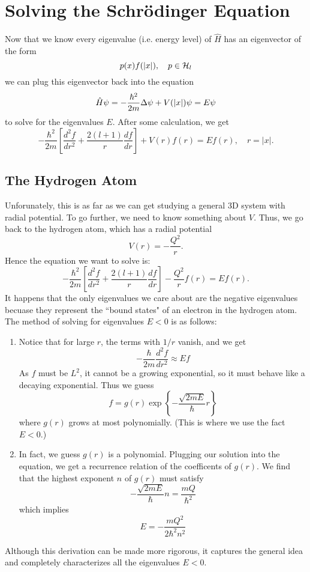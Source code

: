 \section{Solving the Schr\"{o}dinger Equation}
Now that we know every eigenvalue (i.e. energy level) of $\hat{H}$ has an eigenvector of the form
\[
    p(x)f(|x|), \quad p \in {\mathcal H}_l
\]
we can plug this eigenvector back into the equation
\[
    \hat{H}\psi = -\frac{\hbar^2}{2m}\Delta\psi + V(|x|)\psi = E\psi
\]
to solve for the eigenvalues $E$. After some calculation, we get
\[
    - \frac{\hbar^2}{2m}\left[ \frac{d^2f}{dr^2} + \frac{2(l+1)}{r} \frac{df}{dr} \right] + V(r)f(r) = Ef(r), \quad r = |x|.
\]
\subsection{The Hydrogen Atom}
Unforunately, this is as far as we can get studying a general 3D system with radial potential. To go further, we need to know something about $V$. Thus, we go back to the hydrogen atom, which has a radial potential
\[
    V(r) = - \frac{Q^2}{r}.
\]
Hence the equation we want to solve is:
\[
    - \frac{\hbar^2}{2m}\left[ \frac{d^2f}{dr^2} + \frac{2(l+1)}{r} \frac{df}{dr} \right] - \frac{Q^2}{r}f(r) = Ef(r).
\]
It happens that the only eigenvalues we care about are the negative eigenvalues becuase they represent the ``bound states" of an electron in the hydrogen atom. The method of solving for eigenvalues $E < 0$ is as follows:
\begin{enumerate}
    \item Notice that for large $r$, the terms with $1/r$ vanish, and we get
        \[
            - \frac{\hbar}{2m} \frac{d^2f}{dr^2} \approx Ef
        \]
        As $f$ must be $L^2$, it cannot be a growing exponential, so it must behave like a decaying exponential. Thus we guess
        \[
            f = g(r) \exp\left\{ - \frac{\sqrt{2mE}}{\hbar}r\right\}
        \]
        where $g(r)$ grows at most polynomially. (This is where we use the fact $E < 0$.)

    \item In fact, we guess $g(r)$ is a polynomial. Plugging our solution into the equation, we get a recurrence relation of the coefficents of $g(r)$. We find that the highest exponent $n$ of $g(r)$ must satisfy
        \[
            - \frac{\sqrt{2mE}}{\hbar} n = \frac{mQ}{\hbar^2}
        \]
        which implies
        \[
            E = - \frac{mQ^2}{2\hbar^2n^2}
        \]
\end{enumerate}
Although this derivation can be made more rigorous, it captures the general idea and completely characterizes all the eigenvalues $E < 0$.

